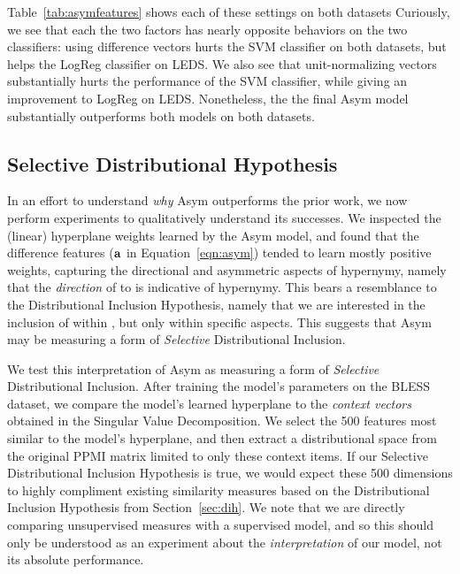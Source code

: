 Table~\ref{tab:asymfeatures} shows each of these settings on both datasets
Curiously, we see that each the two factors has nearly opposite behaviors
on the two classifiers: using difference vectors hurts the SVM classifier on
both datasets, but helps the LogReg classifier on LEDS. We also see that
unit-normalizing vectors substantially hurts the performance of the SVM
classifier, while giving an improvement to LogReg on LEDS. Nonetheless, the
the final Asym model substantially outperforms both models on both datasets.

\subsection{Selective Distributional Hypothesis}
\label{sec:selectivedih}

In an effort to understand {\em why} Asym outperforms the prior work, we
now perform experiments to qualitatively understand its successes. We
inspected the (linear) hyperplane weights learned by the Asym model,
and found that the difference features (${\mathbf{a}}$ in Equation~\ref{eqn:asym})
tended to learn mostly positive weights, capturing the directional and
asymmetric aspects of hypernymy, namely that the {\em direction} of 
to  is indicative of hypernymy. This bears a resemblance to the
Distributional Inclusion Hypothesis, namely that we are interested in the
inclusion of  within , but only within specific aspects.
This suggests that Asym may be measuring a form of {\em Selective}
Distributional Inclusion.

We test this interpretation of Asym as measuring a form of {\em Selective}
Distributional Inclusion. After training the model's parameters on the BLESS
dataset, we compare the model's learned hyperplane to the {\em context vectors}
obtained in the Singular Value Decomposition. We select the 500 features most
similar to the model's hyperplane, and then extract a distributional space from
the original PPMI matrix limited to only these context items.  If our Selective
Distributional Inclusion Hypothesis is true, we would expect these 500
dimensions to highly compliment existing similarity measures based on the
Distributional Inclusion Hypothesis from Section~\ref{sec:dih}. We note
that we are directly comparing unsupervised measures with a supervised model,
and so this should only be understood as an experiment about the {\em
interpretation} of our model, not its absolute performance.

